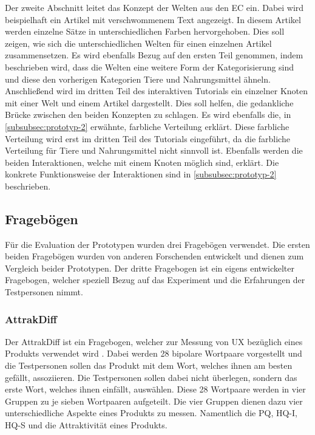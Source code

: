 Der zweite Abschnitt leitet das Konzept der Welten aus den \ac{EC} ein.
Dabei wird beispielhaft ein Artikel mit verschwommenem Text angezeigt.
In diesem Artikel werden einzelne Sätze in unterschiedlichen Farben hervorgehoben.
Dies soll zeigen, wie sich die unterschiedlichen Welten für einen einzelnen Artikel zusammensetzen.
Es wird ebenfalls Bezug auf den ersten Teil genommen, indem beschrieben wird, dass die Welten eine weitere Form der Kategorisierung sind und diese den vorherigen Kategorien Tiere und Nahrungsmittel ähneln.\\

Anschließend wird im dritten Teil des interaktiven Tutorials ein einzelner Knoten mit einer Welt und einem Artikel dargestellt.
Dies soll helfen, die gedankliche Brücke zwischen den beiden Konzepten zu schlagen.
Es wird ebenfalls die, in \autoref{subsubsec:prototyp-2} erwähnte, farbliche Verteilung erklärt.
Diese farbliche Verteilung wird erst im dritten Teil des Tutorials eingeführt, da die farbliche Verteilung für Tiere und Nahrungsmittel nicht sinnvoll ist.
Ebenfalls werden die beiden Interaktionen, welche mit einem Knoten möglich sind, erklärt.
Die konkrete Funktionsweise der Interaktionen sind in \autoref{subsubsec:prototyp-2} beschrieben.\\

\subsection{Fragebögen}
Für die Evaluation der Prototypen wurden drei Fragebögen verwendet.
Die ersten beiden Fragebögen wurden von anderen Forschenden entwickelt und dienen zum Vergleich beider Prototypen.
Der dritte Fragebogen ist ein eigens entwickelter Fragebogen, welcher speziell Bezug auf das Experiment und die Erfahrungen der Testpersonen nimmt.\\

\subsubsection{AttrakDiff}
Der AttrakDiff ist ein Fragebogen, welcher zur Messung von \ac{UX} bezüglich eines Produkts verwendet wird \cite{attrakdiff-2000, attrakdiff-2003, attrakdiff-2008}.
Dabei werden 28 bipolare Wortpaare vorgestellt und die Testpersonen sollen das Produkt mit dem Wort, welches ihnen am besten gefällt, assoziieren.
Die Testpersonen sollen dabei nicht überlegen, sondern das erste Wort, welches ihnen einfällt, auswählen.
Diese 28 Wortpaare werden in vier Gruppen zu je sieben Wortpaaren aufgeteilt.
Die vier Gruppen dienen dazu vier unterschiedliche Aspekte eines Produkts zu messen.
Namentlich die \ac{PQ}, \ac{HQ-I}, \ac{HQ-S} und die Attraktivität eines Produkts.\\

